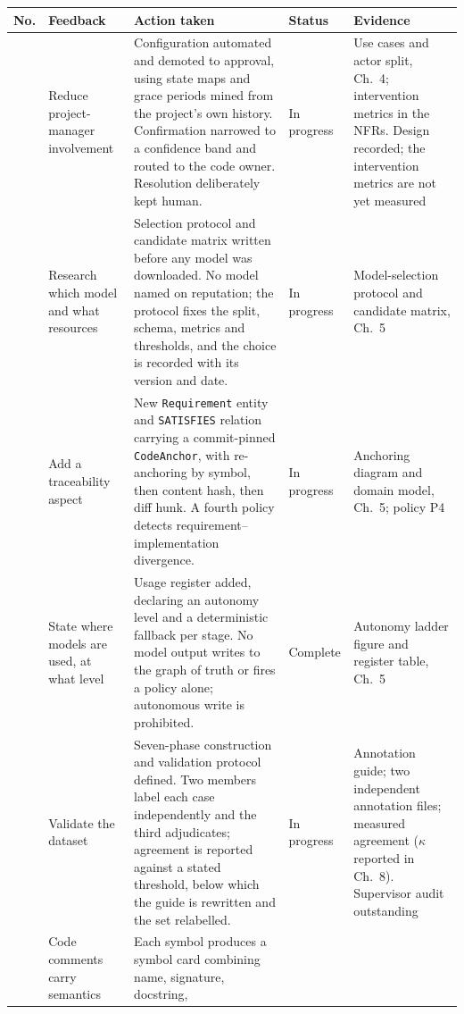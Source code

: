 \begin{longtable}{>{\raggedright\arraybackslash}p{}>{\raggedright\arraybackslash}p{}>{\raggedright\arraybackslash}p{}>{\raggedright\arraybackslash}p{}>{\raggedright\arraybackslash}p{}}
\toprule
No. & Feedback & Action taken & Status & Evidence \\
\midrule
\endhead
1 & Reduce project-manager involvement
  & Configuration automated and demoted to approval, using state maps and grace
    periods mined from the project's own history. Confirmation narrowed to a
    confidence band and routed to the code owner. Resolution deliberately kept
    human.
  & In progress
  & Use cases and actor split, Ch.~4; intervention metrics in the NFRs.
    Design recorded; the intervention metrics are not yet measured \\
2 & Research which model and what resources
  & Selection protocol and candidate matrix written before any model was
    downloaded. No model named on reputation; the protocol fixes the split,
    schema, metrics and thresholds, and the choice is recorded with its version
    and date.
  & In progress
  & Model-selection protocol and candidate matrix, Ch.~5 \\
3 & Add a traceability aspect
  & New \texttt{Requirement} entity and \texttt{SATISFIES} relation carrying a
    commit-pinned \texttt{CodeAnchor}, with re-anchoring by symbol, then content
    hash, then diff hunk. A fourth policy detects requirement--implementation
    divergence.
  & In progress
  & Anchoring diagram and domain model, Ch.~5; policy P4 \\
4 & State where models are used, at what level
  & Usage register added, declaring an autonomy level and a deterministic
    fallback per stage. No model output writes to the graph of truth or fires a
    policy alone; autonomous write is prohibited.
  & Complete
  & Autonomy ladder figure and register table, Ch.~5 \\
5 & Validate the dataset
  & Seven-phase construction and validation protocol defined. Two members label
    each case independently and the third adjudicates; agreement is reported
    against a stated threshold, below which the guide is rewritten and the set
    relabelled.
  & In progress
  & Annotation guide; two independent annotation files; measured agreement
    ($\kappa$ reported in Ch.~8). Supervisor audit outstanding \\
6 & Code comments carry semantics
  & Each symbol produces a symbol card combining name, signature, docstring,

\end{longtable}
